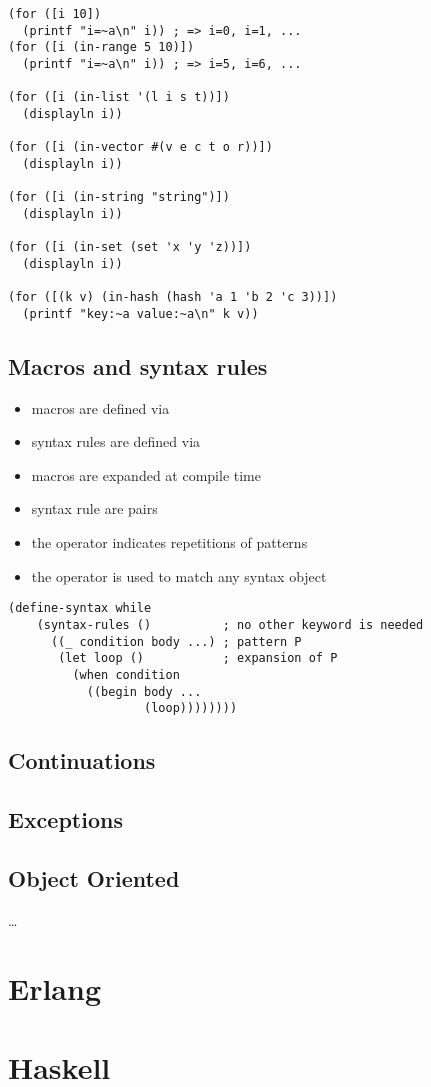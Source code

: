 \documentclass[a4paper,landscape,10pt]{article}
\begin{document}
\begin{multicols*}{2}
  \begin{lstlisting}[language=Racket]
(for ([i 10])
  (printf "i=~a\n" i)) ; => i=0, i=1, ...
(for ([i (in-range 5 10)])
  (printf "i=~a\n" i)) ; => i=5, i=6, ...

(for ([i (in-list '(l i s t))])
  (displayln i))

(for ([i (in-vector #(v e c t o r))])
  (displayln i))

(for ([i (in-string "string")])
  (displayln i))

(for ([i (in-set (set 'x 'y 'z))])
  (displayln i))

(for ([(k v) (in-hash (hash 'a 1 'b 2 'c 3))])
  (printf "key:~a value:~a\n" k v))
  \end{lstlisting}

  \subsection{Macros and syntax rules}

  \begin{itemize}
    \item macros are defined via 
    \item syntax rules are defined via 
    \item macros are expanded at compile time
    \item syntax rule are pairs 
    \item the  operator indicates repetitions of patterns
    \item the \iracket{_} operator is used to match any syntax object
  \end{itemize}

  \begin{lstlisting}[language=Racket]
  (define-syntax while
    (syntax-rules ()          ; no other keyword is needed
      ((_ condition body ...) ; pattern P
       (let loop ()           ; expansion of P
         (when condition
           ((begin body ...
                   (loop))))))))
  \end{lstlisting}

  \subsection{Continuations}

  \subsection{Exceptions}

  \subsection{Object Oriented}

  \dots

\end{multicols*}

\clearpage

\section{Erlang}

\clearpage

\section{Haskell}
\end{document}
